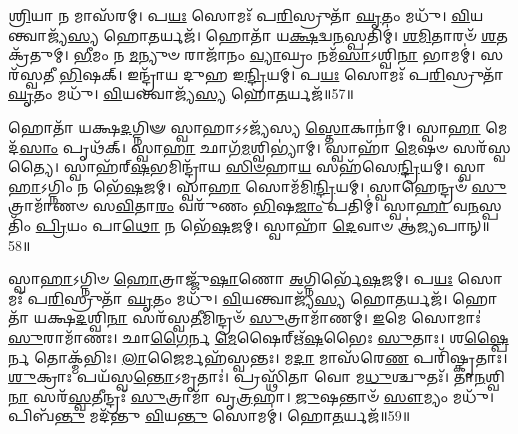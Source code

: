 \-\ul{𑌶𑍍𑌰𑌿}\-𑌯𑌾 𑌨 𑌮𑌾𑌸᳴𑌰𑌮𑍍।
𑌪\-\ul{𑌯𑌃} 𑌸𑍋𑌮𑌃᳴ 𑌪\-\ul{𑌰𑌿}\-𑌸𑍍𑌰𑍁𑌤𑌾᳴ \ul{𑌘𑍃}\-𑌤𑌂 𑌮𑌧𑍁᳴।
\-\ul{𑌵𑌿}\-𑌯𑌨𑍍𑌤𑍍𑌵𑌾𑌜𑍍𑌯᳴\-\ul{𑌸𑍍𑌯} 𑌹𑍋\-\ul{𑌤}\-𑌰𑍍𑌯𑌜᳴।
𑌹𑍋𑌤𑌾᳴ 𑌯\-\ul{𑌕𑍍𑌷}\-𑌦𑍍𑌵\-\ul{𑌨}\-𑌸𑍍𑌪𑌤𑌿𑌮𑍍॑।
\-\ul{𑌶}\-\-\ul{𑌮𑌿}\-𑌤𑌾𑌰𑍞᳴ \ul{𑌶}\-𑌤𑌕𑍍𑌰᳴𑌤𑍁𑌮𑍍।
\-\ul{𑌭𑍀}\-𑌮𑌂 𑌨 \ul{𑌮}\-𑌨𑍍𑌯𑍁𑍞 𑌰𑌾𑌜𑌾᳴𑌨𑌂 \ul{𑌵𑍍𑌯𑌾}\-𑌘𑍍𑌰𑌂 𑌨𑌮᳴\-\ul{𑌸𑌾}\-\-𑌽𑌶𑍍𑌵𑌿\-\ul{𑌨𑌾} 𑌭𑌾𑌮𑌮𑍍॑।
𑌸𑌰᳴𑌸𑍍𑌵𑌤𑍀 \ul{𑌭𑌿}\-𑌷𑌕𑍍।
𑌇𑌨𑍍𑌦𑍍𑌰𑌾᳴𑌯 𑌦𑍁𑌹 𑌇\-\ul{𑌨𑍍𑌦𑍍𑌰𑌿}\-𑌯𑌮𑍍।
𑌪\-\ul{𑌯𑌃} 𑌸𑍋𑌮𑌃᳴ 𑌪\-\ul{𑌰𑌿}\-𑌸𑍍𑌰𑍁𑌤𑌾᳴ \ul{𑌘𑍃}\-𑌤𑌂 𑌮𑌧𑍁᳴।
\-\ul{𑌵𑌿}\-𑌯𑌨𑍍𑌤𑍍𑌵𑌾𑌜𑍍𑌯᳴\-\ul{𑌸𑍍𑌯} 𑌹𑍋\-\ul{𑌤}\-𑌰𑍍𑌯𑌜᳴॥57॥

𑌹𑍋𑌤𑌾᳴ 𑌯𑌕𑍍𑌷\-\ul{𑌦}\-𑌗𑍍𑌨𑌿𑍟 𑌸𑍍𑌵𑌾𑌹𑌾\-𑌽𑌽𑌜𑍍𑌯᳴𑌸𑍍𑌯 \ul{𑌸𑍍𑌤𑍋}\-𑌕𑌾𑌨𑌾॑𑌮𑍍।
𑌸𑍍𑌵𑌾\-\ul{𑌹𑌾} 𑌮𑍇𑌦᳴\-\ul{𑌸𑌾𑌂} 𑌪𑍃𑌥᳴𑌕𑍍।
𑌸𑍍𑌵𑌾\-\ul{𑌹𑌾} 𑌛𑌾𑌗᳴\-\ul{𑌮}\-𑌶𑍍𑌵𑌿𑌭𑍍𑌯𑌾॑𑌮𑍍।
𑌸𑍍𑌵𑌾𑌹𑌾᳴ \ul{𑌮𑍇}\-𑌷𑍞 𑌸𑌰᳴𑌸𑍍𑌵𑌤𑍍𑌯𑍈।
𑌸𑍍𑌵𑌾𑌹᳴𑌰𑍍‌\mbox{}\-\ul{𑌷}\-𑌭𑌮𑌿𑌨𑍍𑌦𑍍𑌰𑌾᳴𑌯 \ul{𑌸𑌿}\-\-\ul{𑍞}\-𑌹𑌾\-\ul{𑌯} 𑌸𑌹᳴𑌸𑍇\-\ul{𑌨𑍍𑌦𑍍𑌰𑌿}\-𑌯𑌮𑍍।
𑌸𑍍𑌵𑌾\-\ul{𑌹𑌾}\-\-𑌽𑌗𑍍𑌨𑌿𑌂 𑌨 𑌭𑍇᳴\-\ul{𑌷}\-𑌜𑌮𑍍।
𑌸𑍍𑌵𑌾\-\ul{𑌹𑌾} 𑌸𑍋𑌮᳴𑌮𑌿\-\ul{𑌨𑍍𑌦𑍍𑌰𑌿}\-𑌯𑌮𑍍।
𑌸𑍍𑌵𑌾𑌹𑍇𑌨𑍍𑌦𑍍𑌰𑍞᳴ \ul{𑌸𑍁}\-𑌤𑍍𑌰𑌾𑌮𑌾᳴𑌣𑍞 𑌸\-\ul{𑌵𑌿}\-𑌤𑌾\-\ul{𑌰𑌂} 𑌵𑌰𑍁᳴𑌣𑌂 \ul{𑌭𑌿}\-𑌷\-\ul{𑌜𑌾𑌂} 𑌪𑌤𑌿𑌮𑍍॑।
𑌸𑍍𑌵𑌾\-\ul{𑌹𑌾} 𑌵\-\ul{𑌨}\-𑌸𑍍𑌪𑌤𑌿𑌂᳴ \ul{𑌪𑍍𑌰𑌿}\-𑌯𑌂 𑌪𑌾\-\ul{𑌥𑍋} 𑌨 𑌭𑍇᳴\-\ul{𑌷}\-𑌜𑌮𑍍।
𑌸𑍍𑌵𑌾𑌹𑌾᳴ \ul{𑌦𑍇}\-𑌵𑌾𑍞 𑌆॑\-\ul{𑌜𑍍𑌯}\-𑌪𑌾𑌨𑍍॥58॥

𑌸𑍍𑌵𑌾\-\ul{𑌹𑌾}\-\-𑌽𑌗𑍍𑌨𑌿𑍞 \ul{𑌹𑍋}\-𑌤𑍍𑌰𑌾𑌜𑍍𑌜𑍁᳴\-\ul{𑌷𑌾}\-𑌣𑍋 \ul{𑌅}\-𑌗𑍍𑌨𑌿𑌰𑍍𑌭𑍇᳴\-\ul{𑌷}\-𑌜𑌮𑍍।
𑌪\-\ul{𑌯𑌃} 𑌸𑍋𑌮𑌃᳴ 𑌪\-\ul{𑌰𑌿}\-𑌸𑍍𑌰𑍁𑌤𑌾᳴ \ul{𑌘𑍃}\-𑌤𑌂 𑌮𑌧𑍁᳴।
\-\ul{𑌵𑌿}\-𑌯𑌨𑍍𑌤𑍍𑌵𑌾𑌜𑍍𑌯᳴\-\ul{𑌸𑍍𑌯} 𑌹𑍋\-\ul{𑌤}\-𑌰𑍍𑌯𑌜᳴।
𑌹𑍋𑌤𑌾᳴ 𑌯𑌕𑍍𑌷\-\ul{𑌦}\-𑌶𑍍𑌵𑌿\-\ul{𑌨𑌾} 𑌸𑌰᳴𑌸𑍍𑌵\-\ul{𑌤𑍀}\-𑌮𑌿𑌨𑍍𑌦𑍍𑌰𑍞᳴ \ul{𑌸𑍁}\-𑌤𑍍𑌰𑌾𑌮𑌾᳴𑌣𑌮𑍍।
\-\ul{𑌇}\-𑌮𑍇 𑌸𑍋𑌮𑌾𑌃॑ \ul{𑌸𑍁}\-𑌰𑌾𑌮𑌾᳴𑌣𑌃।
𑌛𑌾\-\ul{𑌗𑍈}\-𑌰𑍍𑌨 \ul{𑌮𑍇}\-𑌷𑍈𑌰𑍍\mbox{}𑌋᳴\-\ul{𑌷}\-𑌭𑍈𑌃 \ul{𑌸𑍁}\-𑌤𑌾𑌃।
𑌶\-\ul{𑌷𑍍𑌪𑍈}\-𑌰𑍍𑌨 𑌤𑍋𑌕𑍍𑌮᳴𑌭𑌿𑌃।
\-\ul{𑌲𑌾}\-𑌜𑍈𑌰𑍍𑌮𑌹᳴𑌸𑍍𑌵𑌨𑍍𑌤𑌃।
𑌮\-\ul{𑌦𑌾} 𑌮𑌾𑌸᳴𑌰𑍇\-\ul{𑌣} 𑌪𑌰𑌿᳴𑌷𑍍𑌕𑍃𑌤𑌾𑌃।
\-\ul{𑌶𑍁}\-𑌕𑍍𑌰𑌾𑌃 𑌪𑌯᳴𑌸𑍍𑌵\-\ul{𑌨𑍍𑌤𑍋}\-\-𑌽𑌮𑍃𑌤𑌾𑌃॑।
𑌪𑍍𑌰𑌸𑍍𑌥𑌿᳴𑌤𑌾 𑌵𑍋 𑌮\-\ul{𑌧𑍁}\-𑌶𑍍𑌚𑍁𑌤𑌃᳴।
𑌤𑌾\-\ul{𑌨}\-𑌶𑍍𑌵𑌿\-\ul{𑌨𑌾} 𑌸𑌰᳴\-\ul{𑌸𑍍𑌵}\-𑌤𑍀𑌨𑍍𑌦𑍍𑌰𑌃᳴ \ul{𑌸𑍁}\-𑌤𑍍𑌰𑌾𑌮𑌾᳴ 𑌵𑍃\-\ul{𑌤𑍍𑌰}\-𑌹𑌾।
\-\ul{𑌜𑍁}\-𑌷𑌨𑍍𑌤𑌾𑍞᳴ \ul{𑌸𑍗}\-𑌮𑍍𑌯𑌂 𑌮𑌧𑍁᳴।
𑌪𑌿𑌬᳴\-\ul{𑌨𑍍𑌤𑍁} 𑌮𑌦᳴𑌨𑍍𑌤𑍁 \ul{𑌵𑌿}\-𑌯\-\ul{𑌨𑍍𑌤𑍁} 𑌸𑍋𑌮𑌮𑍍॑।
𑌹𑍋\-\ul{𑌤}\-𑌰𑍍𑌯𑌜᳴॥59॥

